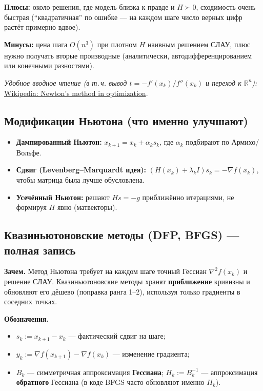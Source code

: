 \documentclass[12pt,a4paper]{article}
\newcommand{\R}{\mathbb{R}}
\newcommand{\grad}{\nabla}
\begin{document}
\textbf{Плюсы:} около решения, где модель близка к правде и \(H\succ 0\), сходимость очень быстрая (``квадратичная'' по ошибке --- на каждом шаге число верных цифр растёт примерно вдвое).

\textbf{Минусы:} цена шага \(O(n^3)\) при плотном \(H\) наивным решением СЛАУ, плюс нужно получать вторые производные (аналитически, автодифференцированием или конечными разностями).

\textit{Удобное вводное чтение (в т.\,ч. вывод \(t=-f'(x_k)/f''(x_k)\) и переход к \(\R^n\)):}
\href{https://en.wikipedia.org/wiki/Newton\%27s_method_in_optimization}{Wikipedia: Newton's method in optimization}.

\subsection{Модификации Ньютона (что именно улучшают)}
\begin{itemize}
  \item \textbf{Дампированный Ньютон:} \(x_{k+1}=x_k+\alpha_k s_k\), где \(\alpha_k\) подбирают по Армихо/Вольфе.
  \item \textbf{Сдвиг (Levenberg--Marquardt идея):} \((H(x_k)+\lambda_k I)s_k=-\grad f(x_k)\), чтобы матрица была лучше обусловлена.
  \item \textbf{Усечённый Ньютон:} решают \(H s=-g\) приближённо итерациями, не формируя \(H\) явно (матвекторы).
\end{itemize}

\subsection{Квазиньютоновские методы (DFP, BFGS) --- полная запись}
\textbf{Зачем.} Метод Ньютона требует на каждом шаге точный Гессиан \(\nabla^2 f(x_k)\) и решение СЛАУ. Квазиньютоновские методы хранят \textbf{приближение} кривизны и обновляют его дёшево (поправка ранга 1--2), используя только градиенты в соседних точках.

\textbf{Обозначения.}
\begin{itemize}
  \item \(s_k := x_{k+1}-x_k\) --- фактический сдвиг на шаге;
  \item \(y_k := \grad f(x_{k+1})-\grad f(x_k)\) --- изменение градиента;
  \item \(B_k\) --- симметричная аппроксимация \textbf{Гессиана}; \(H_k:=B_k^{-1}\) --- аппроксимация \textbf{обратного} Гессиана (в коде BFGS часто обновляют именно \(H_k\)).
\end{itemize}
\end{document}
